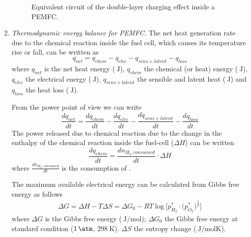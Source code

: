 \documentclass[11pt,a4paper]{article}
\numberwithin{equation}{section}
\theoremstyle{it}
\theoremstyle{definition}
\begin{document}
\begin{enumerate}
\begin{figure}[H]
	\captionsetup{width=0.5\textwidth}		
	\caption{Equivalent circuit of the double-layer charging effect inside a PEMFC.}
	\label{pem_fc_eq_circuit_1}
\end{figure}
	\item \textit{Thermodynamic energy balance for PEMFC.} The net heat generation rate due to the chemical reaction inside the fuel cell, which causes its temperature rise or fall, can be written as 
	\begin{equation}\label{eq37}
		q_{net} = q_{chem} - q_{elec} - q_{sens+latent}-q_{loss}
	\end{equation}
	where $q_{net}$ is the net heat energy ($\SI{}{\joule}$), $q_{chem}$ the chemical (or heat) energy ($\SI{}{\joule}$), $q_{elec}$ the electrical energy ($\SI{}{\joule}$), $q_{sens+latent}$ the sensible and latent heat ($\SI{}{\joule}$) and $q_{loss}$ the heat loss ($\SI{}{\joule}$).
	
	From the power point of view we can write
	\begin{equation}\label{eq38}
		\frac{dq_{net}}{dt} = \frac{dq_{chem}}{dt} - \frac{dq_{elec}}{dt} - \frac{dq_{sens+latent}}{dt} - \frac{dq_{loss}}{dt}
	\end{equation}
	The power released due to chemical reaction due to the change in the enthalpy of the chemical reaction inside the fuel-cell ($\Delta H$) can be written
	\begin{equation}\label{eq39}
		\frac{dq_{chem}}{dt} = \frac{dn_{H_2,consumed}}{dt}\cdot\Delta H
	\end{equation}
where $\frac{dn_{H_2,consumed}}{dt}$ is the consumption of . 

The maximum available electrical energy can be calculated from Gibbs free energy as follows
\begin{equation}\label{eq40}
	\begin{aligned}
		\Delta G = \Delta H - T\Delta S = \Delta G_0 -RT \log \Bigg[{p_{H_2}^*\cdot\Big(p_{O_2}^*\Big)^{\frac{1}{2}}}\Bigg]
	\end{aligned}
\end{equation}
where $\Delta G$ is the Gibbs free energy ($\SI{}{\joule\per\mole}$); $\Delta G_0$ the Gibbs free energy at standard condition ($\SI{1}{\atm}$, $\SI{298}{\kelvin}$). $\Delta S$ the entropy change ($\SI{}{\joule\per\mole\kelvin}$).


\end{enumerate}
\end{document}
